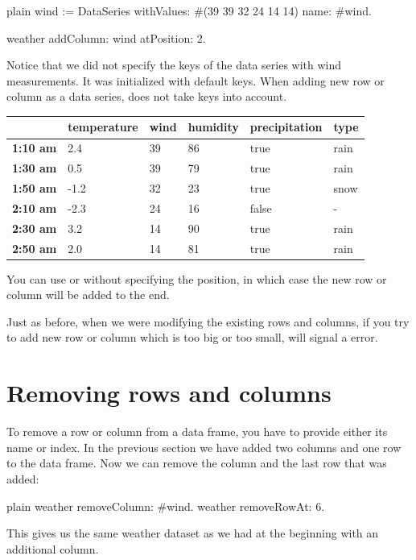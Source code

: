 \documentclass[10pt,twoside,english]{_support/latex/sbabook/sbabook}
\begin{document}
\begin{displaycode}{plain}
wind := DataSeries
  withValues: #(39 39 32 24 14 14)
  name: #wind.

weather
  addColumn: wind
  atPosition: 2.
\end{displaycode}

Notice that we did not specify the keys of the data series with wind measurements. It was initialized with default keys. When adding new row or column as a data series,  does not take keys into account.

\begin{tabular}{llllll}
\toprule
 & \textbf{temperature} & \textbf{wind} & \textbf{humidity} & \textbf{precipitation} & \textbf{type} \\
\midrule
\textbf{1:10 am} & 2.4 & 39 & 86 & true & rain \\
\textbf{1:30 am} & 0.5 & 39 & 79 & true & rain \\
\textbf{1:50 am} & -1.2 & 32 & 23 & true & snow \\
\textbf{2:10 am} & -2.3 & 24 & 16 & false & - \\
\textbf{2:30 am} & 3.2 & 14 & 90 & true & rain \\
\textbf{2:50 am} & 2.0 & 14 & 81 & true & rain \\
\bottomrule
\end{tabular}

You can use  or  without specifying the position, in which case the new row or column will be added to the end.

Just as before, when we were modifying the existing rows and columns, if you try to add new row or column which is too big or too small,  will signal a  error.
\section{Removing rows and columns}
To remove a row or column from a data frame, you have to provide either its name or index. In the previous section we have added two columns and one row to the data frame. Now we can remove the  column and the last row that was added:

\begin{displaycode}{plain}
weather removeColumn: #wind.
weather removeRowAt: 6.
\end{displaycode}

This gives us the same weather dataset as we had at the beginning with an additional  column.
\end{document}
